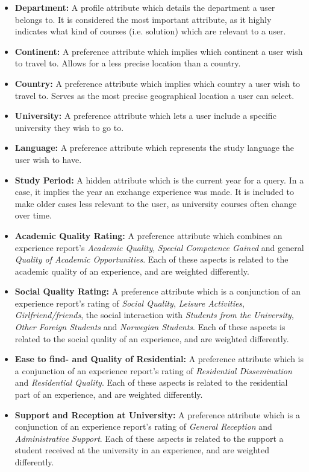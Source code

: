 \begin{itemize}
\item \textbf{Department:} A profile attribute which details the department a user belongs to. It is considered the most important attribute, as it highly indicates what kind of courses (i.e. solution) which are relevant to a user. 

\item \textbf{Continent:} A preference attribute which implies which continent a user wish to travel to. Allows for a less precise location than a country.

\item \textbf{Country:} A preference attribute which implies which country a user wish to travel to. Serves as the most precise geographical location a user can select.

\item \textbf{University:} A preference attribute which lets a user include a specific university they wish to go to.

\item \textbf{Language:} A preference attribute which represents the study language the user wish to have.

\item \textbf{Study Period:} A hidden attribute which is the current year for a query. In a case, it implies the year an exchange experience was made. It is included to make older cases less relevant to the user, as university courses often change over time.

\item \textbf{Academic Quality Rating:} A preference attribute which combines an experience report's \emph{Academic Quality}, \emph{Special Competence Gained} and general \emph{Quality of Academic Opportunities}. Each of these aspects is related to the academic quality of an experience, and are weighted differently.

\item \textbf{Social Quality Rating:} A preference attribute which is a conjunction of an experience report's rating of  \emph{Social Quality}, \emph{Leisure Activities}, \emph{Girlfriend/friends}, the social interaction with \emph{Students from the University}, \emph{Other Foreign Students} and \emph{Norwegian Students}. Each of these aspects is related to the social quality of an experience, and are weighted differently.

\item \textbf{Ease to find- and Quality of Residential:} A preference attribute which is a conjunction of an experience report's rating of \emph{Residential Dissemination} and \emph{Residential Quality}. Each of these aspects is related to the residential part of an experience, and are weighted differently.

\item \textbf{Support and Reception at University:} A preference attribute which is a conjunction of an experience report's rating of \emph{General Reception} and \emph{Administrative Support}. Each of these aspects is related to the support a student received at the university in an experience, and are weighted differently.
\end{itemize}

